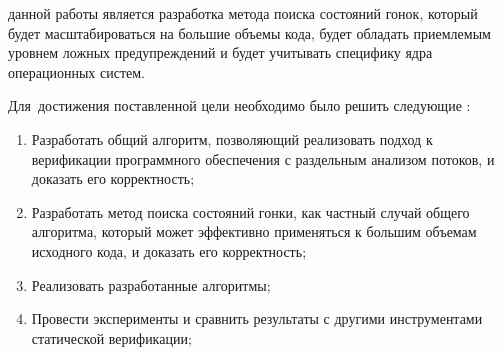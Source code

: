 
%
%


{\aim} данной работы является разработка метода поиска состояний гонок, который будет масштабироваться на большие объемы кода, будет обладать приемлемым уровнем ложных предупреждений и будет учитывать специфику ядра операционных систем.

Для~достижения поставленной цели необходимо было решить следующие {\tasks}:
\begin{enumerate}
  \item Разработать общий алгоритм, позволяющий реализовать подход к верификации программного обеспечения с раздельным анализом потоков, и доказать его корректность;
  \item Разработать метод поиска состояний гонки, как частный случай общего алгоритма, который может эффективно применяться к большим объемам исходного кода, и доказать его корректность;
  \item Реализовать разработанные алгоритмы;
  \item Провести эксперименты и сравнить результаты с другими инструментами статической верификации;
\end{enumerate}

